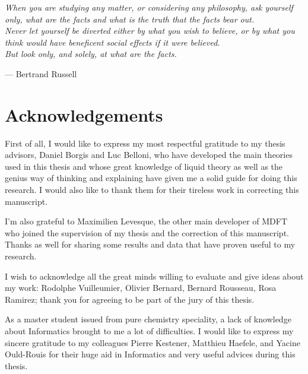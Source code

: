 
\begin{flushright}
\textsl{When you are studying any matter, or considering any philosophy,
ask yourself only, what are the facts and what is the truth that the
facts bear out.}\\
\textsl{ Never let yourself be diverted either by what you wish to
believe, or by what you think would have beneficent social effects
if it were believed.}\\
\textsl{ But look only, and solely, at what are the facts.}
\par\end{flushright}

\begin{flushright}
— Bertrand Russell 
\par\end{flushright}

\bigskip{}

\begingroup
\let\clearpage\relax
\let\cleardoublepage\relax 

\chapter*{Acknowledgements}

First of all, I would like to express my most respectful gratitude
to my thesis advisors, Daniel Borgis and Luc Belloni, who have developed
the main theories used in this thesis and whose great knowledge of
liquid theory as well as the genius way of thinking and explaining
have given me a solid guide for doing this research. I would also
like to thank them for their tireless work in correcting this manuscript.

I'm also grateful to Maximilien Levesque, the other main developer
of MDFT who joined the supervision of my thesis and the correction
of this manuscript. Thanks as well for sharing some results and data
that have proven useful to my research.

I wish to acknowledge all the great minds willing to evaluate and
give ideas about my work: Rodolphe Vuilleumier, Olivier Bernard, Bernard
Rousseau, Rosa Ramirez; thank you for agreeing to be part of the jury
of this thesis.

As a master student issued from pure chemistry speciality, a lack
of knowledge about Informatics brought to me a lot of difficulties.
I would like to express my sincere gratitude to my colleagues Pierre
Kestener, Matthieu Haefele, and Yacine Ould-Rouis for their huge aid
in Informatics and very useful advices during this thesis.

